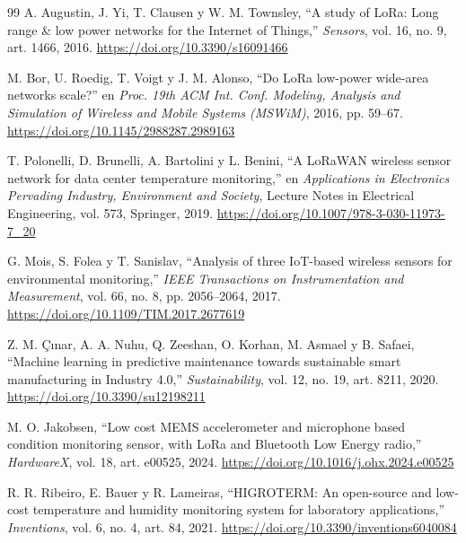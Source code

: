\documentclass[conference]{IEEEtran}
\begin{document}
\begin{thebibliography}{99}
A. Augustin, J. Yi, T. Clausen y W. M. Townsley, ``A study of LoRa: Long range \& low power networks for the Internet of Things,'' \textit{Sensors}, vol. 16, no. 9, art. 1466, 2016. \url{https://doi.org/10.3390/s16091466}

M. Bor, U. Roedig, T. Voigt y J. M. Alonso, ``Do LoRa low-power wide-area networks scale?'' en \textit{Proc. 19th ACM Int. Conf. Modeling, Analysis and Simulation of Wireless and Mobile Systems (MSWiM)}, 2016, pp. 59--67. \url{https://doi.org/10.1145/2988287.2989163}

T. Polonelli, D. Brunelli, A. Bartolini y L. Benini, ``A LoRaWAN wireless sensor network for data center temperature monitoring,'' en \textit{Applications in Electronics Pervading Industry, Environment and Society}, Lecture Notes in Electrical Engineering, vol. 573, Springer, 2019. \url{https://doi.org/10.1007/978-3-030-11973-7_20}

G. Mois, S. Folea y T. Sanislav, ``Analysis of three IoT-based wireless sensors for environmental monitoring,'' \textit{IEEE Transactions on Instrumentation and Measurement}, vol. 66, no. 8, pp. 2056--2064, 2017. \url{https://doi.org/10.1109/TIM.2017.2677619}

Z. M. Çınar, A. A. Nuhu, Q. Zeeshan, O. Korhan, M. Asmael y B. Safaei, ``Machine learning in predictive maintenance towards sustainable smart manufacturing in Industry 4.0,'' \textit{Sustainability}, vol. 12, no. 19, art. 8211, 2020. \url{https://doi.org/10.3390/su12198211}

M. O. Jakobsen, ``Low cost MEMS accelerometer and microphone based condition monitoring sensor, with LoRa and Bluetooth Low Energy radio,'' \textit{HardwareX}, vol. 18, art. e00525, 2024. \url{https://doi.org/10.1016/j.ohx.2024.e00525}

R. R. Ribeiro, E. Bauer y R. Lameiras, ``HIGROTERM: An open-source and low-cost temperature and humidity monitoring system for laboratory applications,'' \textit{Inventions}, vol. 6, no. 4, art. 84, 2021. \url{https://doi.org/10.3390/inventions6040084}

\end{thebibliography}
\end{document}
